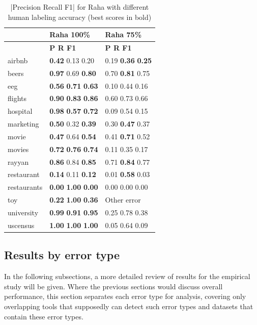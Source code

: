 \begin{table}
\centering
\caption{|Precision Recall F1| for Raha with different human labeling accuracy (best scores in bold)}
\label{tab:raha_empirical}
\begin{tabular}{lll}
\toprule
{} & Raha 100\% & Raha 75\% \\
\midrule
 & \textbf{\space\space\space P \space\space\space\space R \space\space\space F1} & \textbf{\space\space\space P \space\space\space\space R \space\space\space F1} \\
airbnb & \textbf{0.42} 0.13 0.20 & 0.19 \textbf{0.36} \textbf{0.25} \\
beers & \textbf{0.97} 0.69 \textbf{0.80} & 0.70 \textbf{0.81} 0.75 \\
eeg & \textbf{0.56} \textbf{0.71} \textbf{0.63} & 0.10 0.44 0.16 \\
flights & \textbf{0.90} \textbf{0.83} \textbf{0.86} & 0.60 0.73 0.66 \\
hospital & \textbf{0.98} \textbf{0.57} \textbf{0.72} & 0.09 0.54 0.15 \\
marketing & \textbf{0.50} 0.32 \textbf{0.39} & 0.30 \textbf{0.47} 0.37 \\
movie & \textbf{0.47} 0.64 \textbf{0.54} & 0.41 \textbf{0.71} 0.52 \\
movies & \textbf{0.72} \textbf{0.76} \textbf{0.74} & 0.11 0.35 0.17 \\
rayyan & \textbf{0.86} 0.84 \textbf{0.85} & 0.71 \textbf{0.84} 0.77 \\
restaurant & \textbf{0.14} 0.11 \textbf{0.12} & 0.01 \textbf{0.58} 0.03 \\
restaurants & \textbf{0.00} \textbf{1.00} \textbf{0.00} & 0.00 0.00 0.00 \\
toy & \textbf{0.22} \textbf{1.00} \textbf{0.36} & Other error \\
university & \textbf{0.99} \textbf{0.91} \textbf{0.95} & 0.25 0.78 0.38 \\
uscensus & \textbf{1.00} \textbf{1.00} \textbf{1.00} & 0.05 0.64 0.09 \\
\bottomrule
\end{tabular}
\end{table}

\subsection{Results by error type}
In the following subsections, a more detailed review of results for the empirical study will be given. Where the previous sections would discuss overall performance, this section separates each error type for analysis, covering only overlapping tools that supposedly can detect such error types and datasets that contain these error types.

